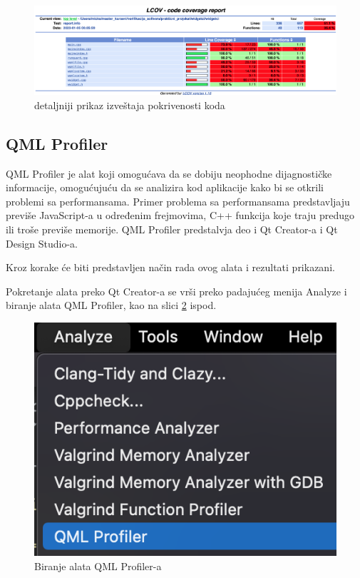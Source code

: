 \documentclass[a4paper]{article}
\begin{document}
\begin{figure}[h!]
\begin{center}
\includegraphics[scale=0.23]{GCov-03.png}
\end{center}
\caption{detaljniji prikaz izveštaja pokrivenosti koda}
\label{fig: GCov-03}
\end{figure}

\subsection{QML Profiler}
QML Profiler je alat koji omogućava da se dobiju neophodne dijagnostičke informacije, omogućujuću da se analizira kod aplikacije kako bi se otkrili problemi sa performansama. Primer problema sa performansama predstavljaju previše JavaScript-a u određenim frejmovima, C++ funkcija koje traju predugo ili troše previše memorije.
QML Profiler predstalvja deo i Qt Creator-a i Qt Design Studio-a.

Kroz korake će biti predstavljen način rada ovog alata i rezultati prikazani.

Pokretanje alata preko Qt Creator-a se vrši preko padajućeg menija Analyze i biranje alata QML Profiler, kao na slici \ref{fig: qml-00} ispod.

\begin{figure}[h!]
\begin{center}
\includegraphics[scale=0.45]{qml-prof-00.png}
\end{center}
\caption{Biranje alata QML Profiler-a}
\label{fig: qml-00}
\end{figure}
\end{document}
